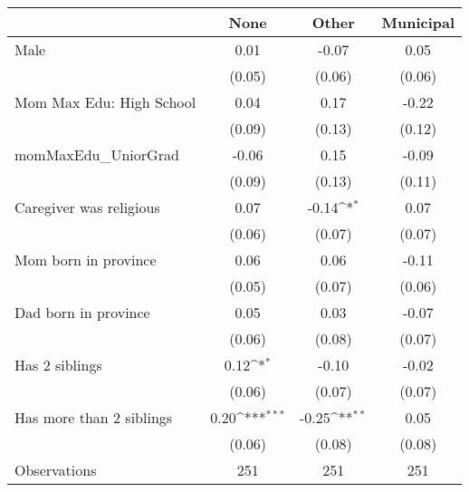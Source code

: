 {
\def\sym#1{\ifmmode^{#1}\else\(^{#1}\)\fi}
\begin{tabular}{l*{3}{c}}
\toprule
                    &\multicolumn{1}{c}{None}&\multicolumn{1}{c}{Other}&\multicolumn{1}{c}{Municipal}\\
\midrule
Male                &        0.01         &       -0.07         &        0.05         \\
                    &      (0.05)         &      (0.06)         &      (0.06)         \\
\addlinespace
Mom Max Edu: High School&        0.04         &        0.17         &       -0.22         \\
                    &      (0.09)         &      (0.13)         &      (0.12)         \\
\addlinespace
momMaxEdu\_UniorGrad &       -0.06         &        0.15         &       -0.09         \\
                    &      (0.09)         &      (0.13)         &      (0.11)         \\
\addlinespace
Caregiver was religious&        0.07         &       -0.14\sym{*}  &        0.07         \\
                    &      (0.06)         &      (0.07)         &      (0.07)         \\
\addlinespace
Mom born in province&        0.06         &        0.06         &       -0.11         \\
                    &      (0.05)         &      (0.07)         &      (0.06)         \\
\addlinespace
Dad born in province&        0.05         &        0.03         &       -0.07         \\
                    &      (0.06)         &      (0.08)         &      (0.07)         \\
\addlinespace
Has 2 siblings      &        0.12\sym{*}  &       -0.10         &       -0.02         \\
                    &      (0.06)         &      (0.07)         &      (0.07)         \\
\addlinespace
Has more than 2 siblings&        0.20\sym{***}&       -0.25\sym{**} &        0.05         \\
                    &      (0.06)         &      (0.08)         &      (0.08)         \\
\midrule
Observations        &         251         &         251         &         251         \\
\bottomrule
\end{tabular}
}
